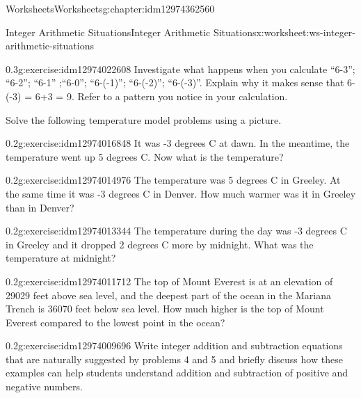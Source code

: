 \documentclass[twoside,11pt,]{book}
\begin{document}
\begin{chapterptx}{Worksheets}{}{Worksheets}{}{}{g:chapter:idm12974362560}
\begin{worksheet-section-numberless}{Integer Arithmetic Situations}{}{Integer Arithmetic Situations}{}{}{x:worksheet:ws-integer-arithmetic-situations}
\begin{introduction}{}
\end{introduction}%
\begin{divisionexercise}{1}{}{0.3}{g:exercise:idm12974022608}%
Investigate what happens when you calculate ``6-3'';  ``6-2'';  ``6-1'' ;``6-0''; ``6-(-1)'';     ``6-(-2)''; ``6-(-3)''.  Explain why it makes sense that 6- (-3) = 6+3 = 9.   Refer to a pattern you notice in your calculation.%
\end{divisionexercise}%
\begin{introduction}{}%
Solve the following temperature model problems using a picture.%
\end{introduction}%
\begin{divisionexercise}{2}{}{0.2}{g:exercise:idm12974016848}%
It was -3 degrees C at dawn. In the meantime, the temperature went up 5 degrees C. Now what is the temperature?%
\end{divisionexercise}%
\clearpage
\begin{divisionexercise}{3}{}{0.2}{g:exercise:idm12974014976}%
The temperature was 5 degrees C in Greeley. At the same time it was -3 degrees C in Denver. How much warmer was it in Greeley than in Denver?%
\end{divisionexercise}%
\begin{divisionexercise}{4}{}{0.2}{g:exercise:idm12974013344}%
The temperature during the day was -3 degrees C in Greeley and it dropped 2 degrees C more by midnight. What was the temperature at midnight?%
\end{divisionexercise}%
\begin{divisionexercise}{5}{}{0.2}{g:exercise:idm12974011712}%
The top of Mount Everest is at an elevation of 29029 feet above sea level, and the deepest part of the ocean in the Mariana Trench is 36070 feet below sea level.  How much higher is the top of Mount Everest compared to the lowest point in the ocean?%
\end{divisionexercise}%
\clearpage
\begin{divisionexercise}{6}{}{0.2}{g:exercise:idm12974009696}%
Write integer addition and subtraction equations that are naturally suggested by problems 4 and 5 and briefly discuss how these examples can help students understand addition and subtraction of positive and negative numbers.%
\end{divisionexercise}%
\end{worksheet-section-numberless}
\restoregeometry
%
%
\typeout{************************************************}
\typeout{************************************************}

\end{chapterptx}
\end{document}
